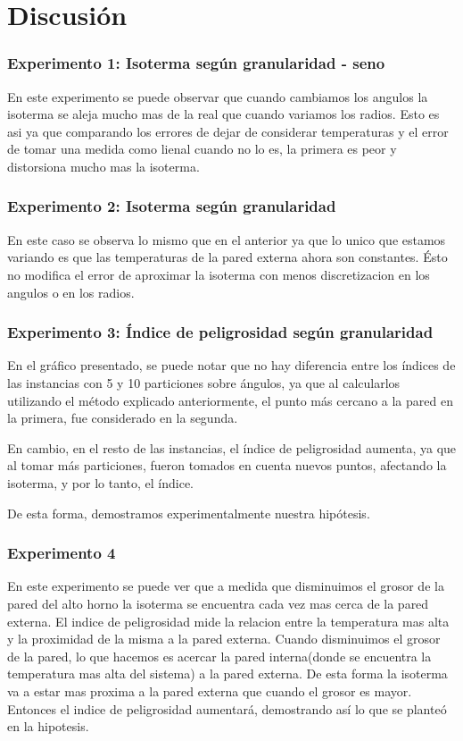 \section{Discusión}


\subsubsection*{Experimento 1: Isoterma según granularidad - seno}
	En este experimento se puede observar que cuando cambiamos los angulos la isoterma se aleja mucho mas de la real que cuando variamos los radios. Esto es asi ya que comparando los errores de dejar de considerar temperaturas y el error de tomar una medida como lienal cuando no lo es, la primera es peor y distorsiona mucho mas la isoterma.
	


\subsubsection*{Experimento 2: Isoterma según granularidad}
	En este caso se observa lo mismo que en el anterior ya que lo unico que estamos variando es que las temperaturas de la pared externa ahora son constantes. Ésto no modifica el error de aproximar la isoterma con menos discretizacion en los angulos o en los radios.



\subsubsection*{Experimento 3: Índice de peligrosidad según granularidad}
  	En el gráfico presentado, se puede notar que no hay diferencia entre los índices de las instancias con 5 y 10 particiones sobre ángulos, ya que al calcularlos utilizando el método explicado anteriormente, el punto más cercano a la pared en la primera, fue considerado en la segunda. 

  	En cambio, en el resto de las instancias, el índice de peligrosidad aumenta, ya que al tomar más particiones, fueron tomados en cuenta nuevos puntos, afectando la isoterma, y por lo tanto, el índice. 

  	De esta forma, demostramos experimentalmente nuestra hipótesis. 


\subsubsection*{Experimento 4}
	En este experimento se puede ver que a medida que disminuimos el grosor de la pared del alto horno la isoterma se encuentra cada vez mas cerca de la pared externa. El indice de peligrosidad mide la relacion entre la temperatura mas alta y la proximidad de la misma a la pared externa. Cuando disminuimos el grosor de la pared, lo que hacemos es acercar la pared interna(donde se encuentra la temperatura mas alta del sistema) a la pared externa. De esta forma la isoterma va a estar mas proxima a la pared externa que cuando el grosor es mayor. Entonces el indice de peligrosidad aumentará, demostrando así lo que se planteó en la hipotesis.
	

